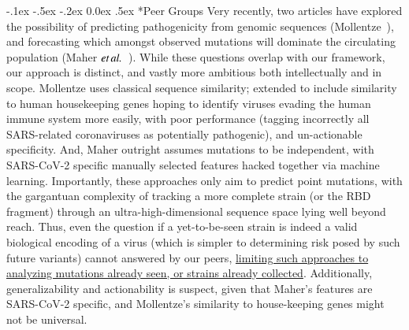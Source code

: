 \documentclass[onecolumn, compsoc,12pt]{IEEEtran}
\makeatletter
\renewcommand\paragraph{\@startsection {section}{1}{\z@}%
                                   {-.1ex \@plus -.5ex \@minus -.2ex}%
                                   {0.0ex \@plus.5ex}%
                                   {\fontsize{11}{10}\selectfont\bfseries\itshape\sffamily\color{black}}}
\def\hcov{SARS-CoV-2\xspace}
\makeatother
\begin{document}
\paragraph*{Peer Groups} %
Very recently, two articles have explored the possibility of predicting pathogenicity  from genomic sequences (Mollentze~\cite{mollentze2021identifying}), and forecasting which amongst observed  mutations will dominate the circulating population (Maher $\textit{et} \mspace{3mu} \textit{al.}$~\cite{maher2021predicting}). While these questions overlap with our framework,  our approach is distinct, and vastly more ambitious both intellectually and in scope. Mollentze  uses  classical  sequence similarity; extended to include similarity to  human housekeeping genes hoping to identify viruses  evading the human immune system more easily, with poor   performance (tagging incorrectly all SARS-related coronaviruses as potentially pathogenic), and un-actionable specificity. And, Maher  outright assumes mutations to be independent, with \hcov specific manually selected features hacked together via  machine learning. Importantly, these approaches  %
only aim to predict point mutations, with  the gargantuan complexity of tracking a more complete strain (or the RBD fragment) through an  ultra-high-dimensional sequence space lying well beyond reach. Thus, even the question  if a yet-to-be-seen strain is indeed a valid biological encoding of a virus (which is simpler to determining risk posed by such future variants) cannot answered by our peers, \uline{limiting such approaches to analyzing mutations already seen, or strains  already collected}.  Additionally, generalizability and actionability is  suspect, given that Maher's features are \hcov specific, and  Mollentze's similarity to house-keeping genes might not be universal. %


\end{document}
